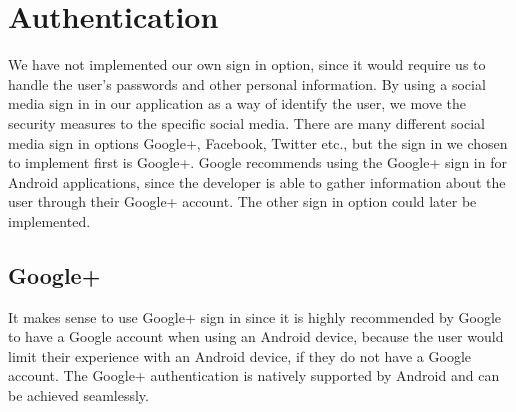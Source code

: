 \section{Authentication}
We have not implemented our own sign in option, since it would require us to handle the user's passwords and other personal information.
By using a social media sign in in our application as a way of identify the user, we move the security measures to the specific social media.
There are many different social media sign in options Google+, Facebook, Twitter etc., but the sign in we chosen to implement first is Google+. 
Google recommends using the Google+ sign in for Android applications, since the developer is able to gather information about the user through their Google+ account. The other sign in option could later be implemented.

\subsection{Google+}
It makes sense to use Google+ sign in since it is highly recommended by Google to have a Google account when using an Android device, because the user would limit their experience with an Android device, if they do not have a Google account. 
The Google+ authentication is natively supported by Android and can be achieved seamlessly.  

